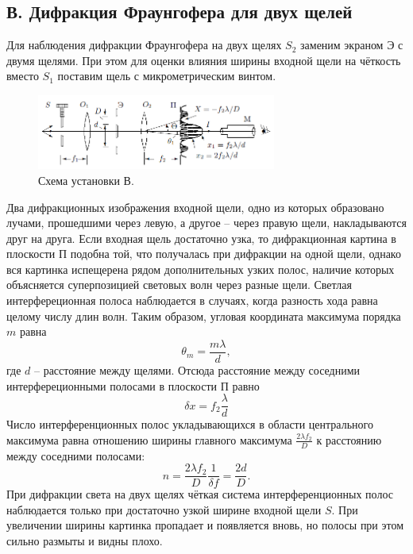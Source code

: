 \documentclass[a4paper,12pt]{article}
\begin{document}
	\subsection*{В. Дифракция Фраунгофера для двух щелей}
	Для наблюдения дифракции Фраунгофера на двух щелях $S_2$ заменим экраном Э с двумя щелями. При этом для оценки влияния ширины входной щели на чёткость вместо $S_1$ поставим щель с микрометрическим винтом.
	\begin{figure}[h]
		\includegraphics[width = 0.7\textwidth]{431-5.png}
		\centering
		\caption{Схема установки В.}
	\end{figure}
	Два дифракционных изображения входной щели, одно из которых образовано лучами, прошедшими через левую, а другое -- через правую щели, накладываются друг на друга.
	Если входная щель достаточно узка, то дифракционная картина в плоскости П подобна той, что получалась при дифракции на одной щели, однако вся картинка испещерена рядом дополнительных узких полос, наличие которых объясняется суперпозицией световых волн через разные щели. Светлая интерфереционная полоса наблюдается в случаях, когда разность хода равна целому числу длин волн. Таким образом, угловая координата максимума порядка $m$ равна
	\begin{equation}
	\theta_m = \dfrac{m \lambda}{d},
	\end{equation}
	где $d$ -- расстояние между щелями. Отсюда расстояние между соседними интерфереционными полосами в плоскости П равно
	\begin{equation}
	\delta x = f_2 \dfrac{\lambda}{d}
	\end{equation}
	Число интерференционных полос укладывающихся в области центрального максимума равна отношению ширины главного максимума $\frac{2\lambda f_2}{D}$ к расстоянию между соседними полосами:
	\begin{equation}
	n = \dfrac{2\lambda f_2}{D} \dfrac{1}{\delta f}= \dfrac{2d}{D}.
	\end{equation}
	При дифракции света на двух щелях чёткая система интерференционных полос наблюдается только при достаточно узкой ширине входной щели $S$. При увеличении ширины картинка пропадает и появляется вновь, но полосы при этом сильно размыты и видны плохо.
\end{document}

